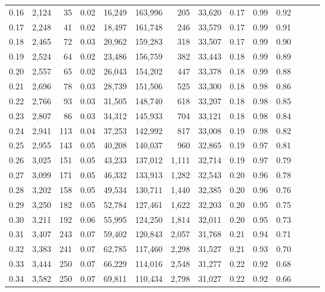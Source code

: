 \begin{tabular}{rrrrrrrrrrrrrr}
0.16 &  2,124 &   35 &  0.02 &   16,249 &  163,996 &     205 &  33,620 &  0.17 &  0.99 &      0.92 \\
0.17 &  2,248 &   41 &  0.02 &   18,497 &  161,748 &     246 &  33,579 &  0.17 &  0.99 &      0.91 \\
0.18 &  2,465 &   72 &  0.03 &   20,962 &  159,283 &     318 &  33,507 &  0.17 &  0.99 &      0.90 \\
0.19 &  2,524 &   64 &  0.02 &   23,486 &  156,759 &     382 &  33,443 &  0.18 &  0.99 &      0.89 \\
0.20 &  2,557 &   65 &  0.02 &   26,043 &  154,202 &     447 &  33,378 &  0.18 &  0.99 &      0.88 \\
0.21 &  2,696 &   78 &  0.03 &   28,739 &  151,506 &     525 &  33,300 &  0.18 &  0.98 &      0.86 \\
0.22 &  2,766 &   93 &  0.03 &   31,505 &  148,740 &     618 &  33,207 &  0.18 &  0.98 &      0.85 \\
0.23 &  2,807 &   86 &  0.03 &   34,312 &  145,933 &     704 &  33,121 &  0.18 &  0.98 &      0.84 \\
0.24 &  2,941 &  113 &  0.04 &   37,253 &  142,992 &     817 &  33,008 &  0.19 &  0.98 &      0.82 \\
0.25 &  2,955 &  143 &  0.05 &   40,208 &  140,037 &     960 &  32,865 &  0.19 &  0.97 &      0.81 \\
0.26 &  3,025 &  151 &  0.05 &   43,233 &  137,012 &   1,111 &  32,714 &  0.19 &  0.97 &      0.79 \\
0.27 &  3,099 &  171 &  0.05 &   46,332 &  133,913 &   1,282 &  32,543 &  0.20 &  0.96 &      0.78 \\
0.28 &  3,202 &  158 &  0.05 &   49,534 &  130,711 &   1,440 &  32,385 &  0.20 &  0.96 &      0.76 \\
0.29 &  3,250 &  182 &  0.05 &   52,784 &  127,461 &   1,622 &  32,203 &  0.20 &  0.95 &      0.75 \\
0.30 &  3,211 &  192 &  0.06 &   55,995 &  124,250 &   1,814 &  32,011 &  0.20 &  0.95 &      0.73 \\
0.31 &  3,407 &  243 &  0.07 &   59,402 &  120,843 &   2,057 &  31,768 &  0.21 &  0.94 &      0.71 \\
0.32 &  3,383 &  241 &  0.07 &   62,785 &  117,460 &   2,298 &  31,527 &  0.21 &  0.93 &      0.70 \\
0.33 &  3,444 &  250 &  0.07 &   66,229 &  114,016 &   2,548 &  31,277 &  0.22 &  0.92 &      0.68 \\
0.34 &  3,582 &  250 &  0.07 &   69,811 &  110,434 &   2,798 &  31,027 &  0.22 &  0.92 &      0.66 \\

\end{tabular}
